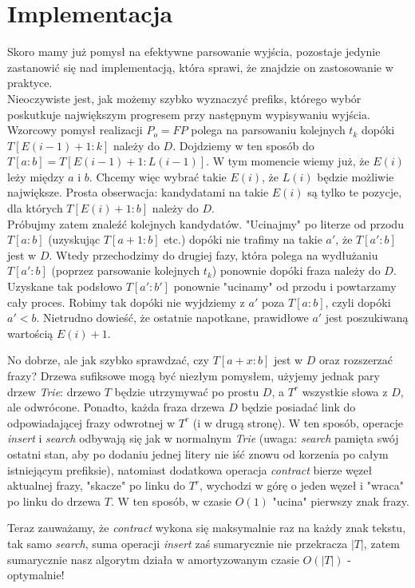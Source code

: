 \documentclass[12pt]{article}
\theoremstyle{plain}
\begin{document}
\section{Implementacja}
Skoro mamy już pomysł na efektywne parsowanie wyjścia, pozostaje jedynie zastanowić się nad implementacją, która sprawi, że znajdzie on zastosowanie w praktyce.\\
Nieoczywiste jest, jak możemy szybko wyznaczyć prefiks, którego wybór poskutkuje największym progresem przy następnym wypisywaniu wyjścia. Wzorcowy pomysł realizacji $P_{o}=FP$ polega na parsowaniu kolejnych $t_{k}$ dopóki $T[E(i-1)+1:k]$ należy do $D$. Dojdziemy w ten sposób do $T[a:b]=T[E(i-1)+1:L(i-1)]$. W tym momencie wiemy już, że $E(i)$ leży między $a$ i $b$. Chcemy więc wybrać takie $E(i)$, że $L(i)$ będzie możliwie największe. Prosta obserwacja: kandydatami na takie $E(i)$ są tylko te pozycje, dla których $T[E(i)+1:b]$ należy do $D$.\\
Próbujmy zatem znaleźć kolejnych kandydatów. "Ucinajmy" po literze od przodu $T[a:b]$ (uzyskując $T[a+1:b]$ etc.) dopóki nie trafimy na takie $a'$, że $T[a':b]$ jest w $D$. Wtedy przechodzimy do drugiej fazy, która polega na wydłużaniu $T[a':b]$ (poprzez parsowanie kolejnych $t_{k}$) ponownie dopóki fraza należy do $D$. Uzyskane tak podsłowo $T[a':b']$ ponownie "ucinamy" od przodu i powtarzamy cały proces. Robimy tak dopóki nie wyjdziemy z $a'$ poza $T[a:b]$, czyli dopóki $a' < b$. Nietrudno dowieść, że ostatnie napotkane, prawidłowe $a'$ jest poszukiwaną wartością $E(i)+1$.

No dobrze, ale jak szybko sprawdzać, czy $T[a+x:b]$ jest w $D$ oraz rozszerzać frazy? Drzewa sufiksowe mogą być niezłym pomysłem, użyjemy jednak pary drzew \textit{Trie}: drzewo $T$ będzie utrzymywać po prostu $D$, a $T^{r}$ wszystkie słowa z $D$, ale odwrócone. Ponadto, każda fraza drzewa $D$ będzie posiadać link do odpowiadającej frazy odwrotnej w $T^{r}$ (i w drugą stronę).
W ten sposób, operacje \textit{insert} i \textit{search} odbywają się jak w normalnym \textit{Trie} (uwaga: \textit{search} pamięta swój ostatni stan, aby po dodaniu jednej litery nie iść znowu od korzenia po całym istniejącym prefiksie), natomiast dodatkowa operacja \textit{contract} bierze węzeł aktualnej frazy, "skacze" po linku do $T^{r}$, wychodzi w górę o jeden węzeł i "wraca" po linku do drzewa $T$. W ten sposób, w czasie $O(1)$ "ucina" pierwszy znak frazy.

Teraz zauważamy, że \textit{contract} wykona się maksymalnie raz na każdy znak tekstu, tak samo \textit{search}, suma operacji \textit{insert} zaś sumarycznie nie przekracza $|T|$, zatem sumarycznie nasz algorytm działa w amortyzowanym czasie $O(|T|)$ - optymalnie!
\end{document}
